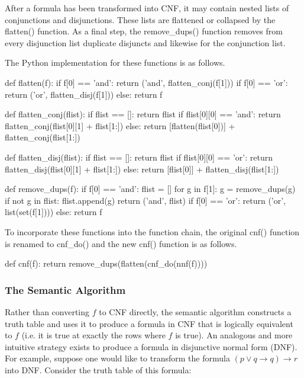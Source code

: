 \documentclass[a4paper,notitlepage]{scrartcl}
\begin{document}
After a formula has been transformed into CNF, it may contain nested lists of
conjunctions and disjunctions.
These lists are flattened or collapsed by the flatten() function.
As a final step, the remove\_dups() function removes from every disjunction
list duplicate disjuncts and likewise for the conjunction list.

The Python implementation for these functions is as follows.

\begin{code}
def flatten(f):
    if f[0] == 'and':
        return ('and', flatten_conj(f[1]))
    if f[0] == 'or':
        return ('or', flatten_disj(f[1]))
    else:
        return f

def flatten_conj(flist):
    if flist == []:
        return flist
    if flist[0][0] == 'and':
        return flatten_conj(flist[0][1] + flist[1:])
    else:
        return [flatten(flist[0])] + flatten_conj(flist[1:])

def flatten_disj(flist):
    if flist == []:
        return flist
    if flist[0][0] == 'or':
        return flatten_disj(flist[0][1] + flist[1:])
    else:
        return [flist[0]] + flatten_disj(flist[1:])

def remove_dups(f):
    if f[0] == 'and':
        flist = []
        for g in f[1]:
            g = remove_dups(g)
            if not g in flist:
                flist.append(g)
        return ('and', flist)
    if f[0] == 'or':
        return ('or', list(set(f[1])))
    else:
        return f
\end{code}

\noindent
To incorporate these functions into the function chain, the original cnf()
function is renamed to cnf\_do() and the new cnf() function is as follows.

\begin{code}
def cnf(f):
    return remove_dups(flatten(cnf_do(nnf(f))))
\end{code}

\subsubsection{The Semantic Algorithm}

Rather than converting $f$ to CNF directly, the semantic algorithm
        constructs a truth table and uses it to produce a formula in CNF
        that is logically equivalent to $f$ (i.e. it is true at exactly
        the rows where $f$ is true). 
An analogous and more intuitive strategy exists to produce a formula in
disjunctive normal form (DNF).
For example, suppose one would like to transform the formula
$(p \lor q \to q) \to r$ into DNF.
Consider the truth table of this formula:
\end{document}
